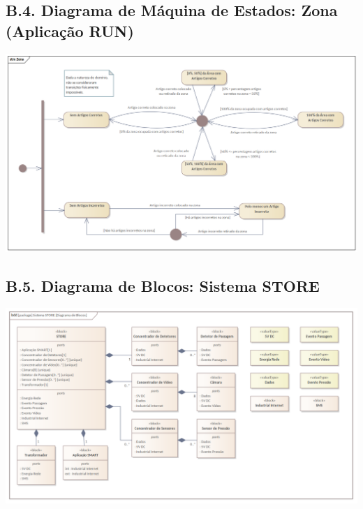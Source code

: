 \documentclass[12pt,a4paper]{article}
\begin{document}
\begin{landscape}
	\section*{B.4. Diagrama de Máquina de Estados: Zona (Aplicação RUN)}
	\includegraphics[width=1.59\textwidth]{../State_Zona.png}
\end{landscape}

\begin{landscape}
	\section*{B.5. Diagrama de Blocos: Sistema STORE}
	\includegraphics[width=1.59\textwidth]{../BDD_STORE.png}
\end{landscape}
\end{document}
